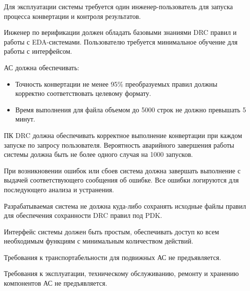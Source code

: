 

Для эксплуатации системы требуется один инженер-пользователь
для запуска процесса конвертации и контроля результатов.

Инженер по верификации должен обладать базовыми знаниями DRC правил
и работы с EDA-системами.
Пользователю требуется минимальное обучение для работы с интерфейсом.


АС должна обеспечивать:

\begin{itemize}
	\item Точность конвертации не менее 95\%
		преобразуемых правил должны корректно
		соответствовать целевому формату.
	\item Время выполнения для файла объемом
		до 5000 строк не должно превышать 5 минут.
\end{itemize}


ПК DRC должна обеспечивать корректное выполнение конвертации
при каждом запуске по запросу пользователя.
Вероятность аварийного завершения работы системы должна быть
не более одного случая на 1000 запусков.

При возникновении ошибок или сбоев система должна завершать выполнение
с выдачей соответствующего сообщения об ошибке.
Все ошибки логируются для последующего анализа и устранения.


Разрабатываемая система не должна куда-либо сохранять исходные файлы правил
для обеспечения сохранности DRC правил под PDK.


Интерфейс системы должен быть простым,
обеспечивать доступ ко всем необходимым функциям
с минимальным количеством действий.


Требования к транспортабельности для подвижных АС
не предъявляется.


Требования к эксплуатации, техническому обслуживанию,
ремонту и хранению компонентов АС не предъявляется.

